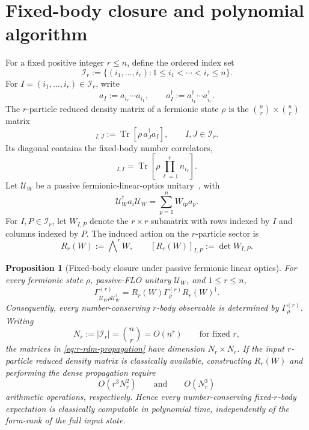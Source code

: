 \documentclass[10pt,twocolumn]{article}
\theoremstyle{plain}
\newtheorem{proposition}{Proposition}
\begin{document}
\section{Fixed-body closure and polynomial algorithm}
\label{sec:fixed-body-closure}

For a fixed positive integer \(r\leq n\), define the ordered index set
\[
\mathcal I_r
:=
\{(i_1,\ldots,i_r):1\leq i_1<\cdots<i_r\leq n\}.
\]
For \(I=(i_1,\ldots,i_r)\in\mathcal I_r\), write
\[
a_I:=a_{i_r}\cdots a_{i_1},
\qquad
a_I^\dagger:=a_{i_1}^\dagger\cdots a_{i_r}^\dagger.
\]
The \(r\)-particle reduced density matrix of a fermionic state \(\rho\)
is the \(\binom nr\times\binom nr\) matrix
\begin{equation}
[\Gamma_\rho^{(r)}]_{I,J}
:=
\operatorname{Tr}\!\left[\rho\,a_J^\dagger a_I\right],
\qquad I,J\in\mathcal I_r.
\label{eq:r-rdm-definition}
\end{equation}
Its diagonal contains the fixed-body number correlators,
\begin{equation}
[\Gamma_\rho^{(r)}]_{I,I}
=
\operatorname{Tr}\!\left[
\rho\prod_{\ell=1}^r n_{i_\ell}
\right].
\label{eq:r-rdm-diagonal-correlator}
\end{equation}
Let \(\mathcal U_W\) be a passive fermionic-linear-optics
unitary~\cite{Bravyi2005}, with
\begin{equation}
\mathcal U_W^\dagger a_i\mathcal U_W
=
\sum_{p=1}^nW_{ip}a_p.
\label{eq:passive-flo-action}
\end{equation}
For \(I,P\in\mathcal I_r\), let \(W_{I,P}\) denote the \(r\times r\)
submatrix with rows indexed by \(I\) and columns indexed by \(P\).
The induced action on the \(r\)-particle sector is
\begin{equation}
R_r(W):=\bigwedge\nolimits^r W,
\qquad
[R_r(W)]_{I,P}:=\det W_{I,P}.
\label{eq:exterior-power-matrix}
\end{equation}

\begin{proposition}[Fixed-body closure under passive fermionic linear optics]
\label{prop:fixed-body-closure}
For every fermionic state \(\rho\), passive-FLO unitary
\(\mathcal U_W\), and \(1\leq r\leq n\),
\begin{equation}
\Gamma_{\mathcal U_W\rho\mathcal U_W^\dagger}^{(r)}
=
R_r(W)\Gamma_\rho^{(r)}R_r(W)^\dagger.
\label{eq:r-rdm-propagation}
\end{equation}
Consequently, every number-conserving \(r\)-body observable is
determined by \(\Gamma_\rho^{(r)}\). Writing
\[
N_r
:=
|\mathcal I_r|
=
\binom nr
=
O(n^r)
\qquad
\text{for fixed }r,
\]
the matrices in \eqref{eq:r-rdm-propagation} have dimension
\(N_r\times N_r\). If the input \(r\)-particle reduced density matrix
is classically available, constructing \(R_r(W)\) and performing the
dense propagation require
\[
O(r^3N_r^2)
\qquad\text{and}\qquad
O(N_r^3)
\]
arithmetic operations, respectively. Hence every number-conserving
fixed-\(r\)-body expectation is classically computable in polynomial
time, independently of the form-rank of the full input state.
\end{proposition}
\end{document}
